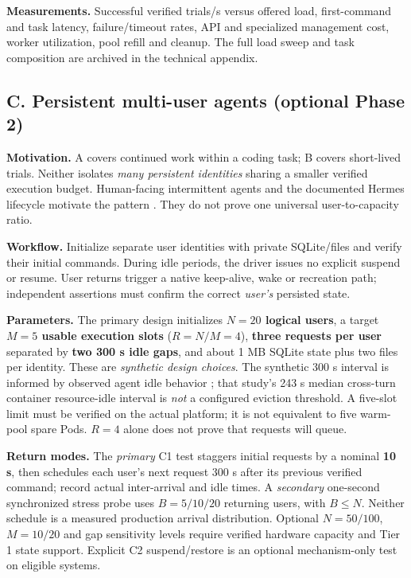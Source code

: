 \documentclass[
  a4paper,
]{article}
\begin{document}
\textbf{Measurements.} Successful
verified trials/s versus offered
load, first-command and task
latency, failure/timeout rates,
API and specialized management
cost, worker utilization,
pool refill and cleanup.
The full load sweep and task
composition are archived in
the technical appendix.

\subsection{C. Persistent multi-user agents (optional Phase 2)}
\label{scenario-c-oversubscription-and-simultaneous-wake-phase-2}

\textbf{Motivation.} A covers
continued work within a coding
task; B covers short-lived trials.
Neither isolates \emph{many
persistent identities} sharing
a smaller verified execution
budget. Human-facing intermittent
agents and the documented Hermes
lifecycle motivate the pattern
\cite{dietz2025,datadog2026,hermesAaaS}.
They do not prove one universal
user-to-capacity ratio.

\textbf{Workflow.} Initialize
separate user identities with
private SQLite/files and verify
their initial commands. During
idle periods, the driver issues
no explicit suspend or resume.
User returns trigger a native
keep-alive, wake or recreation
path; independent assertions
must confirm the correct
\emph{user's} persisted state.

\textbf{Parameters.} The primary
design initializes \textbf{$N=20$
logical users}, a target
\textbf{$M=5$ usable execution
slots} ($R=N/M=4$),
\textbf{three requests per user}
separated by \textbf{two 300 s
idle gaps}, and about 1 MB
SQLite state plus two files
per identity. These are
\emph{synthetic design choices}.
The synthetic 300 s interval
is informed by observed
agent idle behavior
\cite{liu2026}; that study's
243 s median cross-turn
container resource-idle
interval is \emph{not}
a configured eviction
threshold.
A five-slot limit must be
verified on the actual platform;
it is not equivalent to
five warm-pool spare Pods.
$R=4$ alone does not prove
that requests will queue.

\textbf{Return modes.} The
\emph{primary} C1 test
staggers initial requests by
a nominal \textbf{10 s},
then schedules each user's
next request 300 s after its
previous verified command;
record actual inter-arrival
and idle times. A
\emph{secondary} one-second
synchronized stress probe
uses $B=5/10/20$ returning
users, with $B\leq N$.
Neither schedule is a
measured production arrival
distribution. Optional $N=50/100$,
$M=10/20$ and gap sensitivity
levels require verified
hardware capacity and
Tier 1 state support.
Explicit C2 suspend/restore
is an optional mechanism-only
test on eligible systems.
\end{document}
